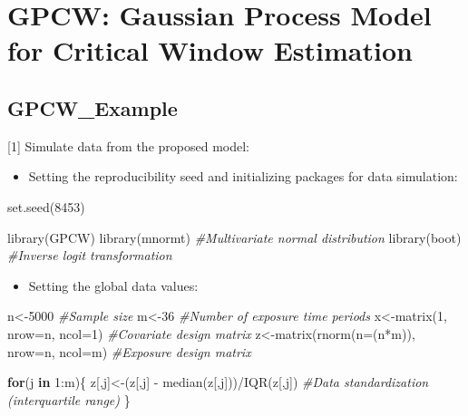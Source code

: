 \documentclass[
]{article}
\author{}
\date{\vspace{-2.5em}}
\newenvironment{Shaded}{\begin{snugshade}}{\end{snugshade}}
\newcommand{\AttributeTok}[1]{\textcolor[rgb]{0.77,0.63,0.00}{#1}}
\newcommand{\CommentTok}[1]{\textcolor[rgb]{0.56,0.35,0.01}{\textit{#1}}}
\newcommand{\ControlFlowTok}[1]{\textcolor[rgb]{0.13,0.29,0.53}{\textbf{#1}}}
\newcommand{\DecValTok}[1]{\textcolor[rgb]{0.00,0.00,0.81}{#1}}
\newcommand{\FunctionTok}[1]{\textcolor[rgb]{0.00,0.00,0.00}{#1}}
\newcommand{\NormalTok}[1]{#1}
\newcommand{\OtherTok}[1]{\textcolor[rgb]{0.56,0.35,0.01}{#1}}
\newcommand{\SpecialCharTok}[1]{\textcolor[rgb]{0.00,0.00,0.00}{#1}}
\providecommand{\tightlist}{%
  \setlength{\itemsep}{0pt}\setlength{\parskip}{0pt}}
\begin{document}
\hypertarget{gpcw-gaussian-process-model-for-critical-window-estimation}{%
\section{GPCW: Gaussian Process Model for Critical Window
Estimation}\label{gpcw-gaussian-process-model-for-critical-window-estimation}}

\hypertarget{gpcw_example}{%
\subsection{GPCW\_Example}\label{gpcw_example}}

{[}1{]} Simulate data from the proposed model:

\begin{itemize}
\tightlist
\item
  Setting the reproducibility seed and initializing packages for data
  simulation:
\end{itemize}

\begin{Shaded}
\begin{Highlighting}[]
\FunctionTok{set.seed}\NormalTok{(}\DecValTok{8453}\NormalTok{)}

\FunctionTok{library}\NormalTok{(GPCW)  }
\FunctionTok{library}\NormalTok{(mnormt)  }\CommentTok{\#Multivariate normal distribution}
\FunctionTok{library}\NormalTok{(boot)  }\CommentTok{\#Inverse logit transformation}
\end{Highlighting}
\end{Shaded}

\begin{itemize}
\tightlist
\item
  Setting the global data values:
\end{itemize}

\begin{Shaded}
\begin{Highlighting}[]
\NormalTok{n}\OtherTok{\textless{}{-}}\DecValTok{5000}  \CommentTok{\#Sample size}
\NormalTok{m}\OtherTok{\textless{}{-}}\DecValTok{36}  \CommentTok{\#Number of exposure time periods}
\NormalTok{x}\OtherTok{\textless{}{-}}\FunctionTok{matrix}\NormalTok{(}\DecValTok{1}\NormalTok{, }
          \AttributeTok{nrow=}\NormalTok{n, }
          \AttributeTok{ncol=}\DecValTok{1}\NormalTok{)  }\CommentTok{\#Covariate design matrix}
\NormalTok{z}\OtherTok{\textless{}{-}}\FunctionTok{matrix}\NormalTok{(}\FunctionTok{rnorm}\NormalTok{(}\AttributeTok{n=}\NormalTok{(n}\SpecialCharTok{*}\NormalTok{m)), }
          \AttributeTok{nrow=}\NormalTok{n, }
          \AttributeTok{ncol=}\NormalTok{m)  }\CommentTok{\#Exposure design matrix}

\ControlFlowTok{for}\NormalTok{(j }\ControlFlowTok{in} \DecValTok{1}\SpecialCharTok{:}\NormalTok{m)\{}
\NormalTok{   z[,j]}\OtherTok{\textless{}{-}}\NormalTok{(z[,j] }\SpecialCharTok{{-}} \FunctionTok{median}\NormalTok{(z[,j]))}\SpecialCharTok{/}\FunctionTok{IQR}\NormalTok{(z[,j])  }\CommentTok{\#Data standardization (interquartile range)}
\NormalTok{   \}}
\end{Highlighting}
\end{Shaded}
\end{document}
